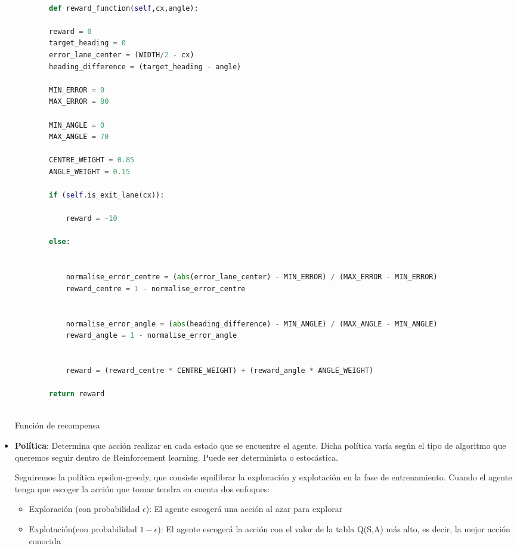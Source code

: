 \begin{itemize}
    \begin{code}[H]
      \begin{lstlisting}[language=Python]
  
        def reward_function(self,cx,angle):

        reward = 0
        target_heading = 0
        error_lane_center = (WIDTH/2 - cx)
        heading_difference = (target_heading - angle) 
        
        MIN_ERROR = 0
        MAX_ERROR = 80

        MIN_ANGLE = 0
        MAX_ANGLE = 70

        CENTRE_WEIGHT = 0.85
        ANGLE_WEIGHT = 0.15
        
        if (self.is_exit_lane(cx)):
            
            reward = -10

        else:

            
            normalise_error_centre = (abs(error_lane_center) - MIN_ERROR) / (MAX_ERROR - MIN_ERROR)
            reward_centre = 1 - normalise_error_centre

            
            normalise_error_angle = (abs(heading_difference) - MIN_ANGLE) / (MAX_ANGLE - MIN_ANGLE)
            reward_angle = 1 - normalise_error_angle


            reward = (reward_centre * CENTRE_WEIGHT) + (reward_angle * ANGLE_WEIGHT)
            
        return reward
       
      \end{lstlisting}
      \caption[Función de recompensa]{Función de recompensa}
      \label{cod:codejemplo}
      \end{code}
    \item \textbf{Política}: Determina que acción realizar en cada estado que se encuentre el agente. Dicha política varía según el tipo de algoritmo que queremos seguir dentro de Reinforcement learning.
    Puede ser determinista o estocástica. \newline

    Seguiremos la política epsilon-greedy\cite{Epsilon-greedy}, que consiste 
 equilibrar la exploración y explotación en la fase de entrenamiento. Cuando el agente tenga que escoger la acción que tomar tendra en cuenta dos enfoques:
 
 \begin{itemize}
   \item Exploración (con probabilidad $\epsilon$): El agente escogerá una acción al azar para explorar
   \item Explotación(con probabilidad $ 1 - \epsilon$): El agente escogerá la acción con el valor de la tabla Q(S,A) más alto, es decir, la mejor acción conocida
 \end{itemize}
 

\end{itemize}
